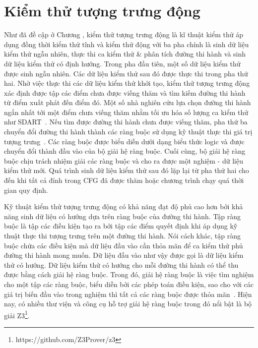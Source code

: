 \section{Kiểm thử tượng trưng động}
Như đã đề cập ở Chương , kiểm thử tượng trưng động là kĩ thuật kiểm thử áp dụng đồng thời kiểm thử tĩnh và kiểm thử động với ba pha chính là sinh dữ liệu kiểm thử ngẫu nhiên, thực thi ca kiểm thử \& phân tích đường thi hành và sinh dữ liệu kiểm thử có định hướng. Trong pha đầu tiên, một số dữ liệu kiểm thử được sinh ngẫu nhiên. Các dữ liệu kiểm thử sau đó được thực thi trong pha thứ hai. Nhờ việc thực thi các dữ liệu kiểm thử khởi tạo, kiểm thử tượng trưng động xác định được tập các điểm chưa được viếng thăm và
tìm kiếm đường thi hành từ điểm xuất phát đến điểm đó. Một số nhà nghiên cứu lựa chọn đường thi hành ngắn nhất tới một điểm chưa viếng thăm nhằm tối ưu hóa số lượng ca kiểm thử như SDART~\cite{SDART}. Nếu tìm được đường thi hành chưa được viếng thăm, pha thứ ba chuyển đổi đường thi hành thành các ràng buộc sử dụng kỹ thuật thực thi giá trị tượng trưng~\cite{SymbolicExecutionForSoftwareTestingThreeDecadesLater}. Các ràng buộc được biểu diễn dưới dạng biểu thức logic và được chuyển đổi thành đầu vào của bộ giải hệ ràng buộc. Cuối cùng, bộ giải hệ ràng buộc chịu trách nhiệm giải các ràng buộc và cho ra được một nghiệm - dữ liệu kiểm thử mới. Quá trình sinh dữ liệu kiểm thử sau đó lặp lại từ pha thứ hai cho đến khi tất cả đỉnh trong CFG đã được thăm hoặc chương trình chạy quá thời gian quy định. 

Kỹ thuật kiểm thử tượng trưng động có khả năng đạt độ phủ cao hơn bởi khả năng sinh dữ liệu có hướng dựa trên ràng buộc của đường thi hành. Tập ràng buộc là tập các điều kiện tạo ra bởi tập các điểm quyết định khi áp dụng kỹ thuật thực thi tượng trưng trên một đường thi hành. Nói cách khác, tập ràng buộc chứa các điều kiện mà dữ liệu đầu vào cần thỏa mãn để ca kiểm thử phủ đường thi hành mong muốn. Dữ liệu đầu vào như vậy được gọi là dữ liệu kiểm thử có hướng. Dữ liệu kiểm thử có hướng cho mỗi đường thi hành có thể thu được bằng cách giải hệ ràng buộc. Trong đó, giải hệ ràng buộc là việc tìm nghiệm cho một tập các ràng buộc, biểu diễn bởi các phép toán điều kiện, sao cho với các giá trị biến đầu vào trong nghiệm thì tất cả các ràng buộc được thỏa mãn~\cite{ref-constraints}. Hiện nay, có nhiều thư viện và công cụ hỗ trợ giải hệ ràng buộc trong đó nổi bật là bộ giải Z3\footnote{https://github.com/Z3Prover/z3}.

